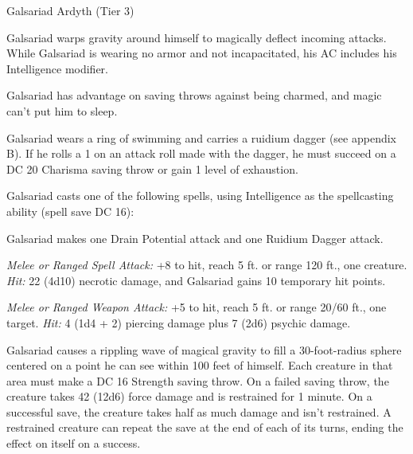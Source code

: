 \documentclass[10pt,a4paper,twoside,bg=none,twocolumn,openany,nodeprecatedcode]{dndbook}
\begin{document}
\begin{DndMonster}[float=t]{Galsariad Ardyth (Tier 3)}
\DndMonsterBasics[
armor-class = {17 (deflection)},
hit-points = {\DndDice{20d8}},
speed = {30 ft., fly 30 ft. \textit{(hover)}, swim 40 ft. \textit{(ring of swimming)}}
]
\DndMonsterAbilityScores[
 str = 8,
 dex = 14,
 con = 10,
 int = 20,
 wis = 15,
 cha = 12
]
\DndMonsterDetails[
saving-throws = {Int +8, Wis +5},
skills = {Arcana +8, Investigation +8, Nature +8},
senses = {darkvision 120 ft., passive perception 12},
languages = {Common, Draconic, Undercommon},
challenge = 8,
]
Galsariad warps gravity around himself to magically deflect incoming attacks. While Galsariad is wearing no armor and not incapacitated, his AC includes his Intelligence modifier.

Galsariad has advantage on saving throws against being charmed, and magic can't put him to sleep.

Galsariad wears a ring of swimming and carries a ruidium dagger (see appendix B). If he rolls a 1 on an attack roll made with the dagger, he must succeed on a DC 20 Charisma saving throw or gain 1 level of exhaustion.

Galsariad casts one of the following spells, using Intelligence as the spellcasting ability (spell save DC 16):
\begin{DndMonsterSpells}
\end{DndMonsterSpells}
\par
{}
Galsariad makes one Drain Potential attack and one Ruidium Dagger attack.

\textsl{Melee or Ranged Spell Attack:} +8 to hit, reach 5 ft. or range 120 ft., one creature. \textsl{Hit:} 22 (4d10) necrotic damage, and Galsariad gains 10 temporary hit points.

\textsl{Melee or Ranged Weapon Attack:} +5 to hit, reach 5 ft. or range 20/60 ft., one target. \textsl{Hit:} 4 (1d4 + 2) piercing damage plus 7 (2d6) psychic damage.

Galsariad causes a rippling wave of magical gravity to fill a 30-foot-radius sphere centered on a point he can see within 100 feet of himself. Each creature in that area must make a DC 16 Strength saving throw. On a failed saving throw, the creature takes 42 (12d6) force damage and is restrained for 1 minute. On a successful save, the creature takes half as much damage and isn't restrained. A restrained creature can repeat the save at the end of each of its turns, ending the effect on itself on a success.


\end{DndMonster}
\end{document}

